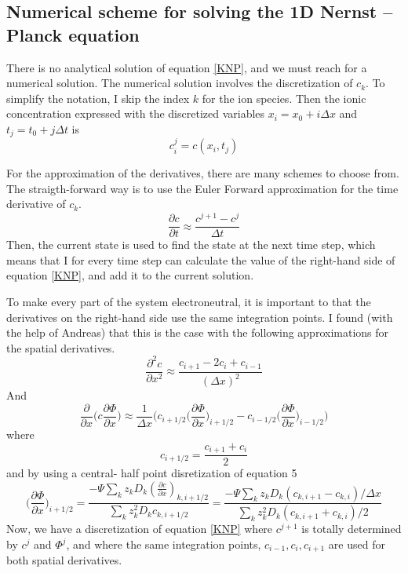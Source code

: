 \documentclass{article}
\begin{document}
\subsection{Numerical scheme for solving the 1D Nernst -- Planck equation}\label{Solving the equation}
There is no analytical solution of equation \ref{KNP}, and we must reach for a numerical solution. The numerical solution involves the discretization of $c_k$. To simplify the notation, I skip the index $k$ for the ion species. Then the ionic concentration expressed with the discretized variables $x_i = x_0 +i \Delta x$ and $t_j = t_0 + j \Delta t$ is 
$$c_i^j = c(x_i, t_j)$$

For the approximation of the derivatives, there are many schemes to choose from. The straigth-forward way is to use the Euler Forward approximation for the time derivative of $c_k$.
$$\frac{\partial c}{\partial t} \approx \frac{c^{j+1}-c^j}{\Delta t}$$
Then, the current state is used to find the state at the next time step, which means that I for every time step can calculate the value of the right-hand side of equation \ref{KNP}, and add it to the current solution. 

To make every part of the system electroneutral, it is important to that the derivatives on the right-hand side use the same integration points. I found (with the help of Andreas) that this is the case with the following approximations for the spatial derivatives. 
$$\frac{\partial^2 c}{\partial x^2} \approx \frac{c_{i+1}-2c_i+c_{i-1}}{(\Delta x)^2}$$
And 
$$\frac{\partial }{\partial x}  \bigg(c \frac{\partial \Phi}{\partial x} \bigg)\approx \frac{1}{\Delta x}\bigg( c_{i+1/2} \big(\frac{\partial \Phi}{\partial x}\big)_{i+1/2} -  c_{i-1/2} \big(\frac{\partial \Phi}{\partial x}\big)_{i-1/2} \bigg) $$
where 
$$c_{i+ 1/2} = \frac{c_{i+1}+ c_i}{2}$$
and by using a central- half point disretization of equation 5
\begin{equation}\label{eq:gradPhi}
\big(\frac{\partial \Phi}{\partial x}\big)_{i+1/2} = \frac{-\Psi \sum_k z_k D_k (\frac{\partial c}{\partial x})_{k,i+1/2}}{\sum_k z_k^2 D_k c_{k,i+1/2}}= \frac{-\Psi \sum_k z_k D_k (c_{k,i+1}-c_{k,i})/\Delta x }{\sum_k z_k^2 D_k (c_{k,i+1}+c_{k,i})/2}
\end{equation}
Now, we have a discretization of equation \ref{KNP} where $c^{j+1}$ is totally determined by $c^j$ and $\Phi^j$, and where the same integration points, $c_{i-1}, c_i, c_{i+1}$ are used for both spatial derivatives.  
\end{document}

